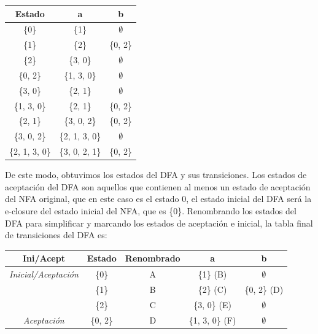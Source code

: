 \documentclass[12pt, letterpaper]{article}
\begin{document}
\begin{enumerate}
    \begin{table}[H]
      \centering
      \begin{tabular}{|c|c|c|}
        \hline
        \textbf{Estado} & \textbf{a}     & \textbf{b} \\ \hline
        \{0\}           & \{1\}          & $\emptyset$   \\ \hline
        \{1\}           & \{2\}          & \{0, 2\}   \\ \hline
        \{2\}           & \{3, 0\}       & $\emptyset$   \\ \hline
        \{0, 2\}        & \{1, 3, 0\}    & $\emptyset$   \\ \hline
        \{3, 0\}        & \{2, 1\}       & $\emptyset$   \\ \hline
        \{1, 3, 0\}     & \{2, 1\}       & \{0, 2\}   \\ \hline
        \{2, 1\}        & \{3, 0, 2\}    & \{0, 2\}   \\ \hline
        \{3, 0, 2\}     & \{2, 1, 3, 0\} & $\emptyset$   \\ \hline
        \{2, 1, 3, 0\}  & \{3, 0, 2, 1\} & \{0, 2\}   \\ \hline
      \end{tabular}
    \end{table}
    De este modo, obtuvimos los estados del DFA y sus transiciones. Los estados de aceptación del DFA son aquellos que contienen al menos un estado de aceptación del NFA original, que en este caso es el estado 0, el estado inicial del DFA será la e-closure del estado inicial del NFA, que es \{0\}. 
    Renombrando los estados del DFA para simplificar y marcando los estados de aceptación e inicial, la tabla final de transiciones del DFA es:
    \begin{table}[H]
      \centering
      \begin{tabular}{|c|c|c|c|c|}
        \hline
        \textbf{Ini/Acept}          & \textbf{Estado} & \textbf{Renombrado} & \textbf{a}     & \textbf{b} \\ \hline
        \textit{Inicial/Aceptación} & \{0\}           & A                   & \{1\} (B)      & $\emptyset$   \\ \hline
        \textit{}                   & \{1\}           & B                   & \{2\} (C)      & \{0, 2\} (D) \\ \hline
        \textit{}                   & \{2\}           & C                   & \{3, 0\} (E)   & $\emptyset$   \\ \hline
        \textit{Aceptación}         & \{0, 2\}        & D                   & \{1, 3, 0\} (F) & $\emptyset$   \\ \hline

\end{tabular}
\end{table}
\end{enumerate}
\end{document}
